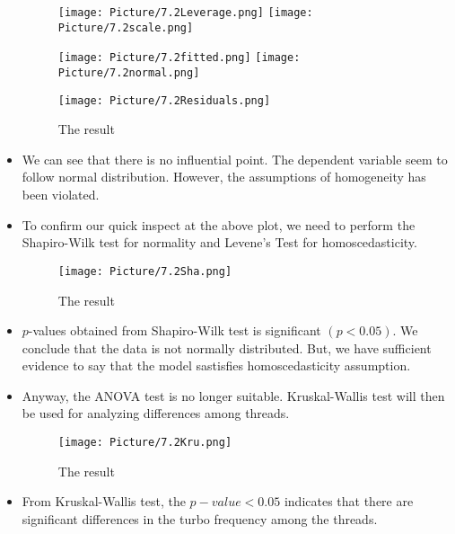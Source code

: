 \documentclass[a4paper]{article}
\begin{document}
\begin{itemize}
    \begin{figure}[H]
        \centering
        \texttt{[image: Picture/7.2Leverage.png]}
        \texttt{[image: Picture/7.2scale.png]}
        \label{7.1.4}
    \end{figure}
    
    \begin{figure}[H]
        \centering
        \texttt{[image: Picture/7.2fitted.png]}
        \texttt{[image: Picture/7.2normal.png]}
        \label{7.1.5}
    \end{figure}
    
    \begin{figure}[H]
        \centering
        \texttt{[image: Picture/7.2Residuals.png]}
        \caption{The result}
        \label{7.1.6}
    \end{figure}
    
    \item[] We can see that there is no influential point. The dependent variable seem to follow normal distribution. However, the assumptions of homogeneity has been violated.
    
    \item[] To confirm our quick inspect at the above plot, we need to perform the Shapiro-Wilk test for normality and Levene's Test for homoscedasticity.
    
    \begin{figure}[H]
        \centering
        \texttt{[image: Picture/7.2Sha.png]}
        \caption{The result}
        \label{7.1.6}
    \end{figure}
    
    \item[] $p$-values obtained from Shapiro-Wilk test is significant $(p<0.05)$. We conclude that the data is not normally distributed. But, we have sufficient evidence to say that the model sastisfies homoscedasticity assumption. 
    
    \item[] Anyway, the ANOVA test is no longer suitable. Kruskal-Wallis test will then be used for analyzing differences among threads.

    \begin{figure}[H]
        \centering
        \texttt{[image: Picture/7.2Kru.png]}
        \caption{The result}
        \label{7.1.7}
    \end{figure}
    
    \item[] From Kruskal-Wallis test, the $p-value < 0.05$ indicates that there are significant differences in the turbo frequency among the threads.
    

\end{itemize}
\end{document}
